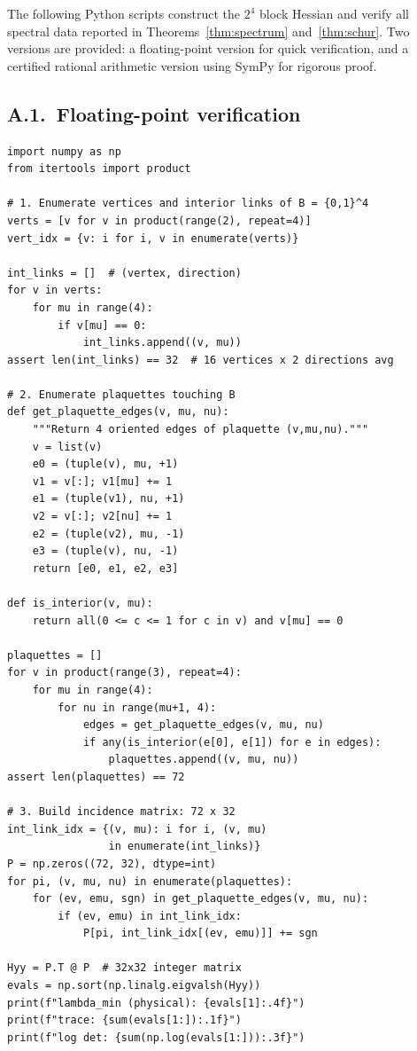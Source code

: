 \documentclass[11pt]{article}
\theoremstyle{definition}
\begin{document}
The following Python scripts construct the $2^4$ block Hessian and
verify all spectral data reported in Theorems~\ref{thm:spectrum}
and~\ref{thm:schur}.  Two versions are provided: a floating-point
version for quick verification, and a certified rational arithmetic
version using SymPy for rigorous proof.

\subsection*{A.1.~Floating-point verification}

\begin{verbatim}
import numpy as np
from itertools import product

# 1. Enumerate vertices and interior links of B = {0,1}^4
verts = [v for v in product(range(2), repeat=4)]
vert_idx = {v: i for i, v in enumerate(verts)}

int_links = []  # (vertex, direction)
for v in verts:
    for mu in range(4):
        if v[mu] == 0:
            int_links.append((v, mu))
assert len(int_links) == 32  # 16 vertices x 2 directions avg

# 2. Enumerate plaquettes touching B
def get_plaquette_edges(v, mu, nu):
    """Return 4 oriented edges of plaquette (v,mu,nu)."""
    v = list(v)
    e0 = (tuple(v), mu, +1)
    v1 = v[:]; v1[mu] += 1
    e1 = (tuple(v1), nu, +1)
    v2 = v[:]; v2[nu] += 1
    e2 = (tuple(v2), mu, -1)
    e3 = (tuple(v), nu, -1)
    return [e0, e1, e2, e3]

def is_interior(v, mu):
    return all(0 <= c <= 1 for c in v) and v[mu] == 0

plaquettes = []
for v in product(range(3), repeat=4):
    for mu in range(4):
        for nu in range(mu+1, 4):
            edges = get_plaquette_edges(v, mu, nu)
            if any(is_interior(e[0], e[1]) for e in edges):
                plaquettes.append((v, mu, nu))
assert len(plaquettes) == 72

# 3. Build incidence matrix: 72 x 32
int_link_idx = {(v, mu): i for i, (v, mu)
                in enumerate(int_links)}
P = np.zeros((72, 32), dtype=int)
for pi, (v, mu, nu) in enumerate(plaquettes):
    for (ev, emu, sgn) in get_plaquette_edges(v, mu, nu):
        if (ev, emu) in int_link_idx:
            P[pi, int_link_idx[(ev, emu)]] += sgn

Hyy = P.T @ P  # 32x32 integer matrix
evals = np.sort(np.linalg.eigvalsh(Hyy))
print(f"lambda_min (physical): {evals[1]:.4f}")
print(f"trace: {sum(evals[1:]):.1f}")
print(f"log det: {sum(np.log(evals[1:])):.3f}")
\end{verbatim}
\end{document}
